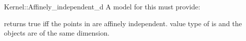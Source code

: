 \begin{ccRefFunctionObjectConcept}{Kernel::Affinely_independent_d}
A model for this must provide:


{returns true iff the points in \ccc{A = tuple [first,last)} are 
affinely independent.
\ccPrecond value type of  is 
and the objects are of the same dimension.}

\end{ccRefFunctionObjectConcept}
